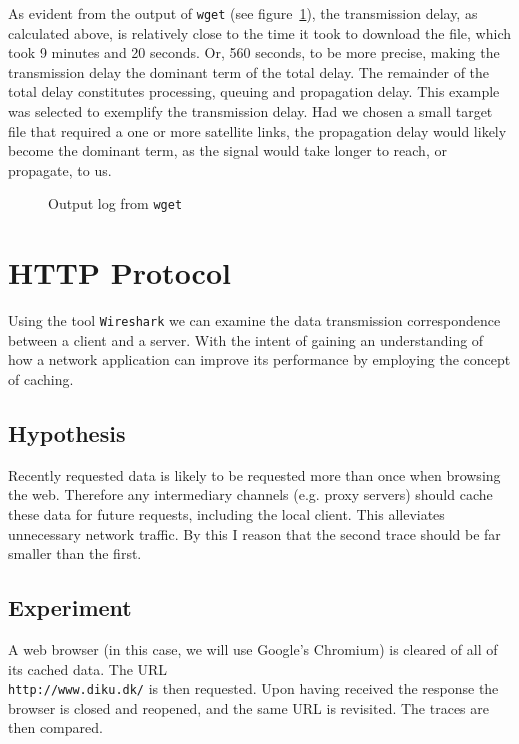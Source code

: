 \documentclass{acm_proc_article-sp}
\newcommand{\prog}[1]{{\tt #1}}
\newcommand{\figref}[1]{(see figure~\ref{#1})}
\begin{document}
As evident from the output of \prog{wget} \figref{fig:wget-output}, the
transmission delay, as calculated above, is relatively close to the time it
took to download the file, which took 9 minutes and 20 seconds. Or, 560
seconds, to be more precise, making the transmission delay the dominant term
of the total delay. The remainder of the total delay constitutes processing,
queuing and propagation delay. This example was selected to exemplify the
transmission delay. Had we chosen a small target file that required a one or
more satellite links, the propagation delay would likely become the dominant
term, as the signal would take longer to reach, or propagate, to us.

\begin{figure}[H]
    
    \caption{Output log from \prog{wget}}
    \label{fig:wget-output}
\end{figure}

\section{HTTP Protocol}
\label{sec:http-protocol}
Using the tool \prog{Wireshark} we can examine the data transmission
correspondence between a client and a server. With the intent of gaining an
understanding of how a network application can improve its performance by
employing the concept of caching.

\subsection{Hypothesis}
\label{sec:http-protocol|sub:hypothesis}
Recently requested data is likely to be requested more than once when browsing
the web. Therefore any intermediary channels (e.g. proxy servers) should cache
these data for future requests, including the local client. This alleviates
unnecessary network traffic. By this I reason that the second trace should be
far smaller than the first.

\subsection{Experiment}
\label{sec:http-protocol|sub:experiment}
A web browser (in this case, we will use Google's Chromium) is cleared of all
of its cached data. The URL\\{\tt http://www.diku.dk/} is then requested. Upon
having received the response the browser is closed and reopened, and the same
URL is revisited. The traces are then compared.
\end{document}
